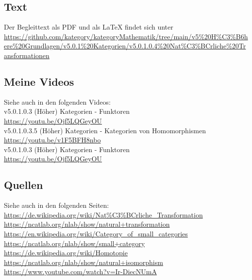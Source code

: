 \documentclass[a4paper]{amsart}
\theoremstyle{definition}
\begin{document}
\subsection*{Text}
Der Begleittext als PDF und als LaTeX findet sich unter
{\tiny
   \url{https://github.com/kategory/kategoryMathematik/tree/main/v5%20H%C3%B6here%20Grundlagen/v5.0.1%20Kategorien/v5.0.1.0.4%20Nat%C3%BCrliche%20Transformationen}
}

\subsection*{Meine Videos}
Siehe auch in den folgenden Videos:\\
v5.0.1.0.3 (Höher) Kategorien - Funktoren\\
\url{https://youtu.be/Ojf5LQGeyOU}\\
v5.0.1.0.3.5 (Höher) Kategorien - Kategorien von Homomorphismen\\
\url{https://youtu.be/v1F5BFH8nbo}\\
v5.0.1.0.3 (Höher) Kategorien - Funktoren\\
\url{https://youtu.be/Ojf5LQGeyOU}\\

\subsection*{Quellen}
Siehe auch in den folgenden Seiten:\\
\url{https://de.wikipedia.org/wiki/Nat%C3%BCrliche_Transformation}\\
\url{https://ncatlab.org/nlab/show/natural+transformation}\\
\url{https://en.wikipedia.org/wiki/Category_of_small_categories}\\
\url{https://ncatlab.org/nlab/show/small+category}\\
\url{https://de.wikipedia.org/wiki/Homotopie}\\
\url{https://ncatlab.org/nlab/show/natural+isomorphism}\\
\url{https://www.youtube.com/watch?v=Ir-DiecNUmA}
\end{document}

